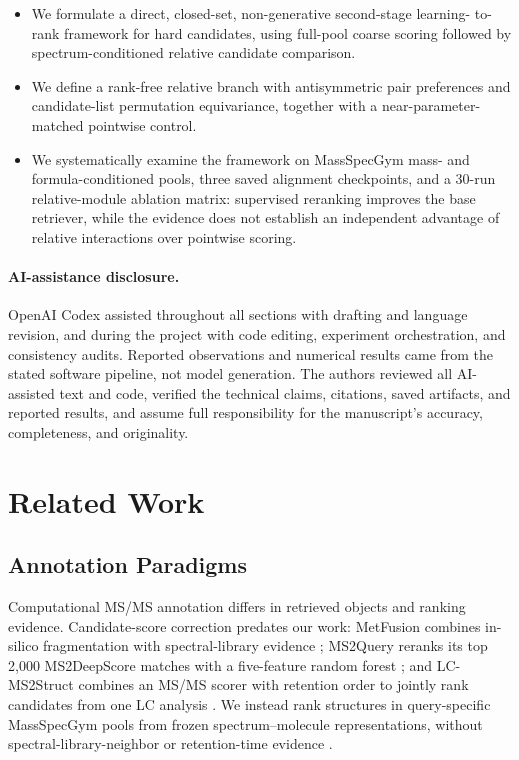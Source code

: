 \documentclass[runningheads]{llncs}
\begin{document}
{\raggedright
\begin{itemize}
  \item We formulate a direct, closed-set, non-generative second-stage learning-
  to-rank framework for hard candidates, using full-pool coarse scoring followed
  by spectrum-conditioned relative candidate comparison.
  \item We define a rank-free relative branch with antisymmetric pair
  preferences and candidate-list permutation equivariance, together with a
  near-parameter-matched pointwise control.
  \item We systematically examine the framework on MassSpecGym mass- and
  formula-conditioned pools, three saved alignment checkpoints, and a 30-run
  relative-module ablation matrix: supervised reranking improves the base
  retriever, while the evidence does not establish an independent advantage
  of relative interactions over pointwise scoring.
\end{itemize}
\par}

\paragraph{AI-assistance disclosure.}
OpenAI Codex assisted throughout all sections with drafting and language
revision, and during the project with code editing, experiment orchestration,
and consistency audits. Reported observations and numerical results came from
the stated software pipeline, not model generation. The authors reviewed all
AI-assisted text and code, verified the technical claims, citations, saved
artifacts, and reported results, and assume full responsibility for the
manuscript's accuracy, completeness, and originality.

\section{Related Work}

\subsection{Annotation Paradigms}

Computational MS/MS annotation differs in retrieved objects and ranking
evidence. Candidate-score correction predates our work: MetFusion combines
in-silico fragmentation with spectral-library evidence
\cite{gerlich2013metfusion}; MS2Query reranks its top 2,000 MS2DeepScore matches
with a five-feature random forest \cite{dejonge2023ms2query}; and LC-MS2Struct
combines an MS/MS scorer with retention order to jointly rank candidates from
one LC analysis \cite{bach2022lcms2struct}. We instead rank structures in
query-specific MassSpecGym pools from frozen spectrum--molecule
representations, without spectral-library-neighbor or retention-time evidence
\cite{bushuiev2024massspecgym}.
\end{document}

